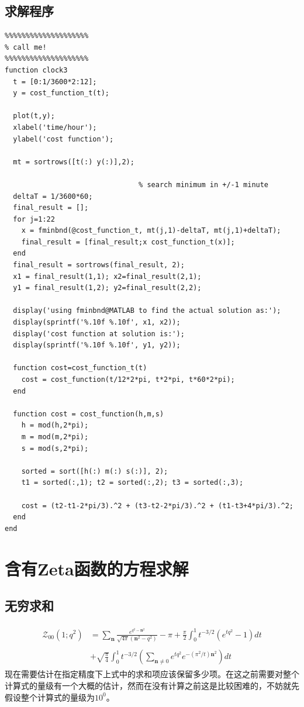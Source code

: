 \documentclass[paper=a4, fontsize=11pt]{scrartcl} %
\numberwithin{equation}{section} %
\numberwithin{figure}{section} %
\numberwithin{table}{section} %
\begin{document}
\begin{CJK*}{UTF8}{gbsn}
\subsection{求解程序}
\lstset{language=MATLAB}
\begin{lstlisting}
%%%%%%%%%%%%%%%%%%%%
% call me!
%%%%%%%%%%%%%%%%%%%%
function clock3
  t = [0:1/3600*2:12];
  y = cost_function_t(t);

  plot(t,y);
  xlabel('time/hour');
  ylabel('cost function');

  mt = sortrows([t(:) y(:)],2);

                                % search minimum in +/-1 minute
  deltaT = 1/3600*60;
  final_result = [];
  for j=1:22
    x = fminbnd(@cost_function_t, mt(j,1)-deltaT, mt(j,1)+deltaT);
    final_result = [final_result;x cost_function_t(x)];
  end
  final_result = sortrows(final_result, 2);
  x1 = final_result(1,1); x2=final_result(2,1);
  y1 = final_result(1,2); y2=final_result(2,2);

  display('using fminbnd@MATLAB to find the actual solution as:');
  display(sprintf('%.10f %.10f', x1, x2));
  display('cost function at solution is:');
  display(sprintf('%.10f %.10f', y1, y2));

  function cost=cost_function_t(t)
    cost = cost_function(t/12*2*pi, t*2*pi, t*60*2*pi);
  end

  function cost = cost_function(h,m,s)
    h = mod(h,2*pi);
    m = mod(m,2*pi);
    s = mod(s,2*pi);

    sorted = sort([h(:) m(:) s(:)], 2);
    t1 = sorted(:,1); t2 = sorted(:,2); t3 = sorted(:,3);

    cost = (t2-t1-2*pi/3).^2 + (t3-t2-2*pi/3).^2 + (t1-t3+4*pi/3).^2;
  end
end

\end{lstlisting}

\pagebreak

\section{含有Zeta函数的方程求解}

\subsection{无穷求和}
\begin{align}
\begin{split}
\mathcal{Z}_{00}(1;q^2) &= \sum_\mathbf{n} \frac{e^{q^2-\mathbf{n}^2}}{\sqrt{4\pi}(\mathbf{n}^2-q^2)}-\pi +\frac{\pi}{2}\int_0^1t^{-3/2}(e^{tq^2}-1)dt \\\\ &+ \sqrt{\frac{\pi}{4}} \int_0^1 t^{-3/2}(\sum_{\mathbf{n}\neq 0} e^{tq^2}e^{-(\pi^2/t)\mathbf{n}^2})dt
\end{split}
\end{align}
现在需要估计在指定精度下上式中的求和项应该保留多少项。在这之前需要对整个计算式的量级有一个大概的估计，然而在没有计算之前这是比较困难的，不妨就先假设整个计算式的量级为$10^0$。


\end{CJK*}
\end{document}
